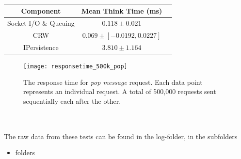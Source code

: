 \documentclass{article}
\begin{document}
                \begin{table}[H]
                    \begin{tabular}{|c|c|c|}
                        \hline 
                        \textbf{Component} & \textbf{Mean Think Time} (ms)\\ 
                        \hline 
                        Socket I/O \& Queuing & $0.118\pm0.021$ \\ 
                        \hline 
                        CRW & $0.069\pm [-0.0192 , 0.0227]$ \\ 
                        \hline 
                        IPersistence & $3.810\pm1.164$ \\ 
                        \hline 
                    \end{tabular}
                \end{table}
                
                \begin{figure}[H]
                    \texttt{[image: responsetime\_500k\_pop]}
                    \caption{The response time for \textit{pop message} request. Each data point represents an individual request. A total of 500,000 requests sent sequentially each after the other.}
                    \label{fig:responsetime_500k_pop}
                \end{figure}                
                ~\\
                \\
                The raw data from these tests can be found in the log-folder, in the subfolders
                \begin{itemize}
                    \item folders
                \end{itemize}               
                
\end{document}
